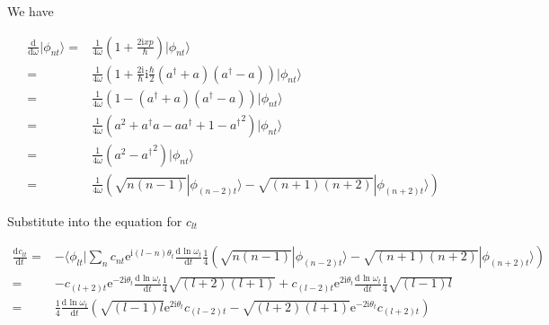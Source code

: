 \documentclass[10pt,fleqn]{article}
\newcommand{\ud}{\mathrm{d}}
\newcommand{\ue}{\mathrm{e}}
\newcommand{\ui}{\mathrm{i}}
\newcommand{\eqar}[1]
{
  \begin{align*}
    #1
  \end{align*}
}
\newcommand{\paren}[1]{{\left({#1}\right)}}
\newcommand{\diff}[3][{}]{{\frac{\ud^{#1} {#2}}{\ud {#3}{}^{#1}}}}
\begin{document}
We have
\eqar{
  \diff{}{\omega}|\phi_{nt}\rangle=&\frac{1}{4\omega}\paren{1 + \frac{2\ui xp}{\hbar}}|\phi_{nt}\rangle\\
  =&\frac{1}{4\omega}\paren{1 + \frac{2\ui}{\hbar}\ui\frac{\hbar}{2}\paren{a^\dagger+a}\paren{a^\dagger-a}}|\phi_{nt}\rangle\\
  =&\frac{1}{4\omega}\paren{1 - \paren{a^\dagger+a}\paren{a^\dagger-a}}|\phi_{nt}\rangle\\
  =&\frac{1}{4\omega}\paren{a^2 + a^\dagger a - aa^\dagger + 1 - {a^\dagger}^2}|\phi_{nt}\rangle\\
  =&\frac{1}{4\omega}\paren{a^2 - {a^\dagger}^2}|\phi_{nt}\rangle\\
  =&\frac{1}{4\omega}\paren{\sqrt{n(n-1)}|\phi_{(n-2)t}\rangle - \sqrt{(n + 1)(n + 2)}|\phi_{(n+2)t}\rangle}
}
Substitute into the equation for $c_{lt}$
\eqar{
  \diff{c_{lt}}{t}=&-\langle\phi_{lt}|\sum_n c_{nt}\ue^{\ui\paren{l-n}\theta_t}\diff{\ln\omega_t}{t}\frac{1}{4}\paren{\sqrt{n(n-1)}|\phi_{(n-2)t}\rangle - \sqrt{(n + 1)(n + 2)}|\phi_{(n+2)t}\rangle}\\
  =&-c_{(l+2)t}\ue^{-2\ui\theta_t}\diff{\ln\omega_t}{t}\frac{1}{4}\sqrt{(l+2)(l+1)}
  +c_{(l-2)t}\ue^{2\ui\theta_t}\diff{\ln\omega_t}{t}\frac{1}{4}\sqrt{(l - 1)l}\\
  =&\frac{1}{4}\diff{\ln\omega_t}{t}\paren{\sqrt{(l - 1)l}\ue^{2\ui\theta_t}c_{(l-2)t}
  -\sqrt{(l+2)(l+1)}\ue^{-2\ui\theta_t}c_{(l+2)t}}
}
\end{document}
